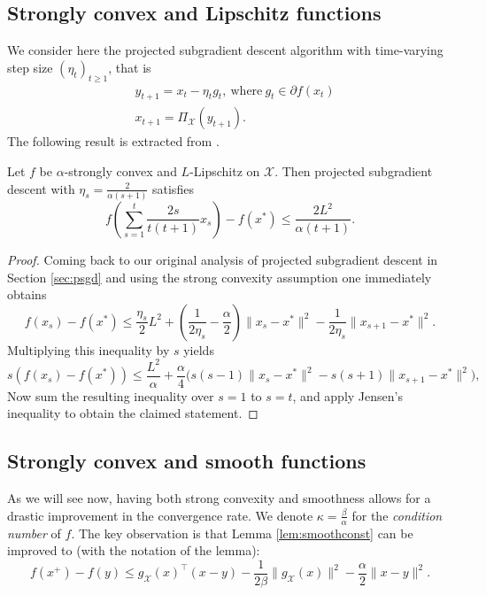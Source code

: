 \documentclass[openany]{now}
\newcommand{\cX}{\mathcal{X}}
\begin{document}
\subsection{Strongly convex and Lipschitz functions}
We consider here the projected subgradient descent algorithm with time-varying step size $(\eta_t)_{t \geq 1}$, that is
\begin{align*}
& y_{t+1} = x_t - \eta_t g_t , \ \text{where} \ g_t \in \partial f(x_t) \\
& x_{t+1} = \Pi_{\cX}(y_{t+1}) .
\end{align*}
The following result is extracted from \cite{LJSB12}.

\begin{theorem} \label{th:LJSB12}
Let $f$ be $\alpha$-strongly convex and $L$-Lipschitz on $\cX$. Then projected subgradient descent with $\eta_s = \frac{2}{\alpha (s+1)}$ satisfies
$$f \left(\sum_{s=1}^t \frac{2 s}{t(t+1)} x_s \right) - f(x^*) \leq \frac{2 L^2}{\alpha (t+1)} .$$
\end{theorem}

\begin{proof}
Coming back to our original analysis of projected subgradient descent in Section \ref{sec:psgd} and using the strong convexity assumption one immediately obtains
$$f(x_s) - f(x^*) \leq \frac{\eta_s}{2} L^2 + \left( \frac{1}{2 \eta_s} - \frac{\alpha}{2} \right) \|x_s - x^*\|^2 - \frac{1}{2 \eta_s} \|x_{s+1} - x^*\|^2 .$$
Multiplying this inequality by $s$ yields
$$s( f(x_s) - f(x^*) ) \leq \frac{L^2}{\alpha} + \frac{\alpha}{4} \bigg( s(s-1) \|x_s - x^*\|^2 - s (s+1) \|x_{s+1} - x^*\|^2 \bigg),$$
Now sum the resulting inequality over $s=1$ to $s=t$, and apply Jensen's inequality to obtain the claimed statement.
\end{proof}

\subsection{Strongly convex and smooth functions}
As we will see now, having both strong convexity and smoothness allows for a drastic improvement in the convergence rate. We denote $\kappa= \frac{\beta}{\alpha}$ for the {\em condition number} of $f$. The key observation is that Lemma \ref{lem:smoothconst} can be improved to (with the notation of the lemma):
\begin{equation} \label{eq:improvedstrongsmooth}
f(x^+) - f(y) \leq g_{\cX}(x)^{\top}(x-y) - \frac{1}{2 \beta} \|g_{\cX}(x)\|^2 - \frac{\alpha}{2} \|x-y\|^2 .
\end{equation}
\end{document}
